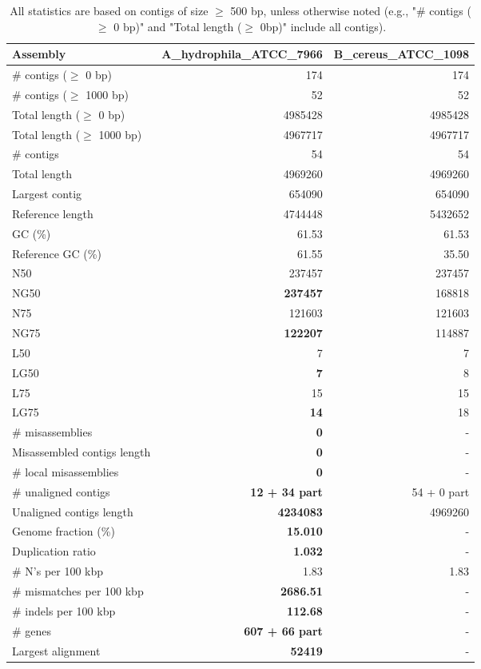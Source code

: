 \documentclass[12pt,a4paper]{article}
\begin{document}
\begin{table}[ht]
\begin{center}
\caption{All statistics are based on contigs of size $\geq$ 500 bp, unless otherwise noted (e.g., "\# contigs ($\geq$ 0 bp)" and "Total length ($\geq$ 0bp)" include all contigs).}
\begin{tabular}{|l*{2}{|r}|}
\hline
Assembly & A\_hydrophila\_ATCC\_7966 & B\_cereus\_ATCC\_1098 \\ \hline
\# contigs ($\geq$ 0 bp) & 174 & 174 \\ \hline
\# contigs ($\geq$ 1000 bp) & 52 & 52 \\ \hline
Total length ($\geq$ 0 bp) & 4985428 & 4985428 \\ \hline
Total length ($\geq$ 1000 bp) & 4967717 & 4967717 \\ \hline
\# contigs & 54 & 54 \\ \hline
Total length & 4969260 & 4969260 \\ \hline
Largest contig & 654090 & 654090 \\ \hline
Reference length & 4744448 & 5432652 \\ \hline
GC (\%) & 61.53 & 61.53 \\ \hline
Reference GC (\%) & 61.55 & 35.50 \\ \hline
N50 & 237457 & 237457 \\ \hline
NG50 & {\bf 237457} & 168818 \\ \hline
N75 & 121603 & 121603 \\ \hline
NG75 & {\bf 122207} & 114887 \\ \hline
L50 & 7 & 7 \\ \hline
LG50 & {\bf 7} & 8 \\ \hline
L75 & 15 & 15 \\ \hline
LG75 & {\bf 14} & 18 \\ \hline
\# misassemblies & {\bf 0} & - \\ \hline
Misassembled contigs length & {\bf 0} & - \\ \hline
\# local misassemblies & {\bf 0} & - \\ \hline
\# unaligned contigs & {\bf 12 + 34 part} & 54 + 0 part \\ \hline
Unaligned contigs length & {\bf 4234083} & 4969260 \\ \hline
Genome fraction (\%) & {\bf 15.010} & - \\ \hline
Duplication ratio & {\bf 1.032} & - \\ \hline
\# N's per 100 kbp & 1.83 & 1.83 \\ \hline
\# mismatches per 100 kbp & {\bf 2686.51} & - \\ \hline
\# indels per 100 kbp & {\bf 112.68} & - \\ \hline
\# genes & {\bf 607 + 66 part} & - \\ \hline
Largest alignment & {\bf 52419} & - \\ \hline
\end{tabular}
\end{center}
\end{table}
\end{document}
